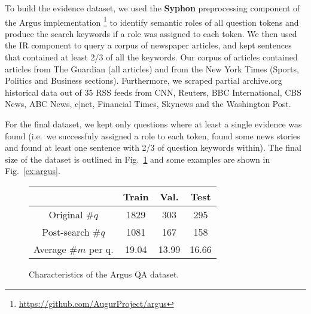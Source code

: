 \documentclass[11pt]{article}
\begin{document}
To build the evidence dataset, we used the \textbf{Syphon} preprocessing component
\cite{argus}
of the Argus implementation%
\footnote{\url{https://github.com/AugurProject/argus}}
to identify semantic roles of all question tokens and produce
the search keywords if a role was assigned to each token.
We then used the IR component to query a corpus of newspaper
articles, and kept sentences that contained at least 2/3 of all
the keywords.
Our corpus of articles contained articles from The Guardian (all articles) and from the New York Times (Sports, Politics and Business sections).  Furthermore, we scraped partial archive.org historical data out of 35 RSS feeds from CNN, Reuters, BBC International, CBS News, ABC News, c|net, Financial Times, Skynews and the Washington Post.

For the final dataset, we kept only questions where at least
a single evidence was found (i.e.\ we successfuly assigned a role
to each token, found some news stories and found at least one
sentence with 2/3 of question keywords within).  The final size
of the dataset is outlined in Fig.~\ref{tab:dataset} and some
examples are shown in Fig.~\ref{ex:argus}.

\begin{figure}
	\centering
	\begin{tabular}{|c|ccc|}
		\hline
		& Train & Val. & Test \\
		\hline
		Original $\#q$ & 1829 & 303 & 295 \\
		Post-search $\#q$ & 1081 & 167 & 158 \\
		Average $\#m$ per q. & 19.04 & 13.99 & 16.66 \\
		\hline
	\end{tabular}
	\vspace*{-0.2cm}
	\caption{\footnotesize%
		Characteristics of the Argus QA dataset.
	}
	\label{tab:dataset}
\end{figure}

\end{document}
